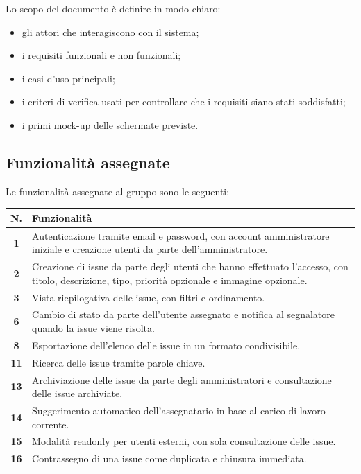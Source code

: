 \documentclass[12pt,a4paper]{article}
\begin{document}
Lo scopo del documento è definire in modo chiaro:

\begin{itemize}[noitemsep]
    \item gli attori che interagiscono con il sistema;
    \item i requisiti funzionali e non funzionali;
    \item i casi d'uso principali;
    \item i criteri di verifica usati per controllare che i requisiti siano stati soddisfatti;
    \item i primi mock-up delle schermate previste.
\end{itemize}

\subsection{Funzionalità assegnate}

Le funzionalità assegnate al gruppo sono le seguenti:

\begin{center}
\begin{tabularx}{\textwidth}{>{\bfseries}c X}
\toprule
N. & Funzionalità \\
\midrule
1 & Autenticazione tramite email e password, con account amministratore iniziale e creazione utenti da parte dell'amministratore. \\
2 & Creazione di issue da parte degli utenti che hanno effettuato l'accesso, con titolo, descrizione, tipo, priorità opzionale e immagine opzionale. \\
3 & Vista riepilogativa delle issue, con filtri e ordinamento. \\
6 & Cambio di stato da parte dell'utente assegnato e notifica al segnalatore quando la issue viene risolta. \\
8 & Esportazione dell'elenco delle issue in un formato condivisibile. \\
11 & Ricerca delle issue tramite parole chiave. \\
13 & Archiviazione delle issue da parte degli amministratori e consultazione delle issue archiviate. \\
14 & Suggerimento automatico dell'assegnatario in base al carico di lavoro corrente. \\
15 & Modalità readonly per utenti esterni, con sola consultazione delle issue. \\
16 & Contrassegno di una issue come duplicata e chiusura immediata. \\
\bottomrule
\end{tabularx}
\end{center}
\end{document}
